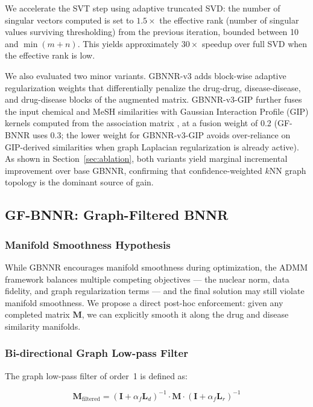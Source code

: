 \documentclass[unnumsec,webpdf,contemporary,large]{oup-authoring-template}
\begin{document}
We accelerate the SVT step using adaptive truncated SVD: the number of singular vectors computed is set to $1.5\times$ the effective rank (number of singular values surviving thresholding) from the previous iteration, bounded between 10 and $\min(m+n)$. This yields approximately $30\times$ speedup over full SVD when the effective rank is low.

We also evaluated two minor variants. GBNNR-v3 adds block-wise adaptive regularization weights that differentially penalize the drug-drug, disease-disease, and drug-disease blocks of the augmented matrix. GBNNR-v3-GIP further fuses the input chemical and MeSH similarities with Gaussian Interaction Profile (GIP) kernels computed from the association matrix \citep{vanlaarhoven2011}, at a fusion weight of 0.2 (GF-BNNR uses 0.3; the lower weight for GBNNR-v3-GIP avoids over-reliance on GIP-derived similarities when graph Laplacian regularization is already active). As shown in Section~\ref{sec:ablation}, both variants yield marginal incremental improvement over base GBNNR, confirming that confidence-weighted $k$NN graph topology is the dominant source of gain.

\subsection{GF-BNNR: Graph-Filtered BNNR}
\label{sec:gfbnnr}

\subsubsection{Manifold Smoothness Hypothesis}
\label{sec:gfbnnr_hypothesis}

While GBNNR encourages manifold smoothness during optimization, the ADMM framework balances multiple competing objectives --- the nuclear norm, data fidelity, and graph regularization terms --- and the final solution may still violate manifold smoothness. We propose a direct post-hoc enforcement: given any completed matrix $\mathbf{M}$, we can explicitly smooth it along the drug and disease similarity manifolds.

\subsubsection{Bi-directional Graph Low-pass Filter}
\label{sec:gfbnnr_filter}

The graph low-pass filter of order~1 is defined as:

\begin{equation}
\mathbf{M}_{\text{filtered}} = (\mathbf{I} + \alpha_f \mathbf{L}_d)^{-1} \cdot \mathbf{M} \cdot (\mathbf{I} + \alpha_f \mathbf{L}_r)^{-1}
\label{eq:gf_filter}
\end{equation}
\end{document}
